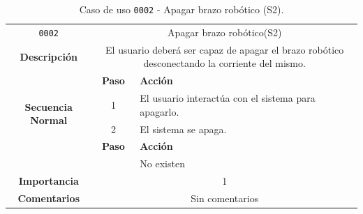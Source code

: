 \begin{table}[H]
    \centering
    \begin{tabularx}{\textwidth}{|c|c|X|}
        \cline{1-3}
        \texttt{0002}                              & \multicolumn{2}{c|}{Apagar brazo robótico(\ac{S2})}                    \\ \cline{1-3}
        \textbf{Descripción}                       & \multicolumn{2}{m{13cm}|}{El usuario deberá ser capaz de apagar el brazo robótico desconectando la corriente del mismo.}
        \\ \cline{1-3}
        \multirow{4}{*}{\textbf{Secuencia Normal}} & \textbf{Paso}  & \textbf{Acción}
        \\ \cline{2-3}                             &   1            & El usuario interactúa con el sistema para apagarlo.
        \\ \cline{2-3}                             &   2            & El sistema se apaga.
        \\ \cline{1-3}
        \multirow{2}{*}{\textbf{Excepciones}}      & \textbf{Paso}                                                                                                                                        & \textbf{Acción}
        \\ \cline{2-3}                    &     & No existen
        \\ \cline{1-3}
        \textbf{Importancia}                       & \multicolumn{2}{c|}{1}                                                                                                                                                 \\ \cline{1-3}
        \textbf{Comentarios}                       & \multicolumn{2}{c|}{Sin comentarios}                                                                                                                                   \\ \cline{1-3}
    \end{tabularx}
    \caption{Caso de uso \texttt{0002} - Apagar brazo robótico (\ac{S2}).}
    \label{tab:CU0002}
    \label{tab:caso_de_uso_apagar_brazo_robotico}
\end{table}

